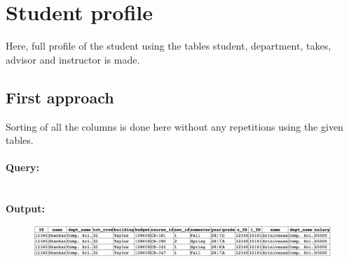 \documentclass[12pt]{article}
\begin{document}



\newpage

\section{Student profile}
Here, full profile of the student using the tables student, department, takes, advisor and instructor is made.

\subsection{First approach}
Sorting of all the columns is done here without any repetitions using the given tables.
\\ \\
\textbf{Query:} \\
\\ \\
\textbf{Output:}
\begin{figure}[hbt]
    \centering
    \includegraphics[scale=0.55]{screenshots/problem2a.png}
    \label{fig:my_label1}
\end{figure}
\end{document}
